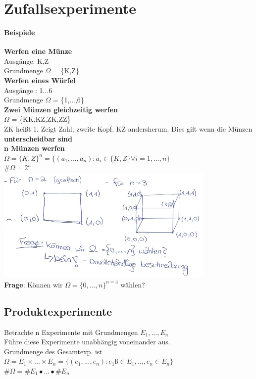 \chapter{Zufallsexperimente}
\subsubsection{Beispiele}
\textbf{Werfen eine Münze}\\ Ausgänge: K,Z\\
Grundmenge $\Omega$ = \{K,Z\}\medskip\\
\textbf{Werfen eines Würfel}\\
Ausgänge : 1...6\\
Grundmenge $\Omega$ = \{1,...,6\}\medskip\\
\textbf{Zwei Münzen gleichzeitig werfen}\\
$\Omega$ = \{KK,KZ,ZK,ZZ\}\\
ZK heißt 1. Zeigt Zahl, zweite Kopf. KZ andersherum. Dies gilt wenn die Münzen \textbf{unterscheidbar sind}\medskip\\
\textbf{n Münzen werfen}\\
$\Omega = \{K,Z\}^n = \{(a_1,...,a_n):a_i \in \{K,Z\} \forall i = 1,...,n\}$\\
\#$\Omega = 2^n$\\
\includegraphics[width=0.8\textwidth]{img/grafikOmega.PNG}
\medskip\\
\textbf{Frage}: Können wir $\Omega = \{0,...,n\}^{n=4}$ wählen?
\section{Produktexperimente}
Betrachte n Experimente mit Grundmengen $E_1,...,E_n$\\
Führe diese Experimente unabhängig voneinander aus.\medskip\\
Grundmenge des Gesamtexp. ist \\$\Omega = E_1\times ... \times E_n = \{(e_1,...,e_n):e_1 ß\in E_1,...,e_n\in E_n\}$\\
\#$\Omega = \#E_1 \bullet ... \bullet \#E_n$

